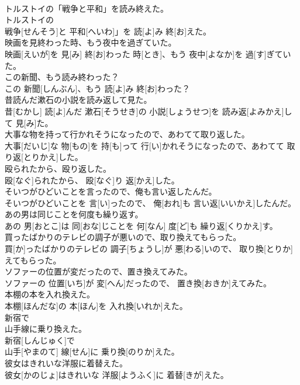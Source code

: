 \documentclass[8pt]{extreport}
\begin{document}
\begin{CJK}{UTF8}{min}
\\	トルストイの「戦争と平和」を読み終えた。	
\\	トルストイの
\\	戦争[せんそう]と 平和[へいわ]」を 読[よ]み 終[お]えた。
\\	映画を見終わった時、もう夜中を過ぎていた。	
\\	映画[えいが]を 見[み] 終[お]わった 時[とき]、もう 夜中[よなか]を 過[す]ぎていた。
\\	この新聞、もう読み終わった？	
\\	この 新聞[しんぶん]、もう 読[よ]み 終[お]わった？
\\	昔読んだ漱石の小説を読み返して見た。	
\\	昔[むかし] 読[よ]んだ 漱石[そうせき]の 小説[しょうせつ]を 読み返[よみかえ]して 見[み]た。
\\	大事な物を持って行かれそうになったので、あわてて取り返した。	
\\	大事[だいじ]な 物[もの]を 持[も]って 行[い]かれそうになったので、あわてて 取り返[とりかえ]した。
\\	殴られたから、殴り返した。	
\\	殴[なぐ]られたから、 殴[なぐ]り 返[かえ]した。
\\	そいつがひどいことを言ったので、俺も言い返したんだ。	
\\	そいつがひどいことを 言[い]ったので、 俺[おれ]も 言い返[いいかえ]したんだ。
\\	あの男は同じことを何度も繰り返す。	
\\	あの 男[おとこ]は 同[おな]じことを 何[なん] 度[ど]も 繰り返[くりかえ]す。
\\	買ったばかりのテレビの調子が悪いので、取り換えてもらった。	
\\	買[か]ったばかりのテレビの 調子[ちょうし]が 悪[わる]いので、 取り換[とりか]えてもらった。
\\	ソファーの位置が変だったので、置き換えてみた。	
\\	ソファーの 位置[いち]が 変[へん]だったので、 置き換[おきか]えてみた。
\\	本棚の本を入れ換えた。	
\\	本棚[ほんだな]の 本[ほん]を 入れ換[いれか]えた。
\\	新宿で
\\	山手線に乗り換えた。	
\\	新宿[しんじゅく]で 
\\	山手[やまのて] 線[せん]に 乗り換[のりか]えた。
\\	彼女はきれいな洋服に着替えた。	
\\	彼女[かのじょ]はきれいな 洋服[ようふく]に 着替[きが]えた。

\end{CJK}
\end{document}

